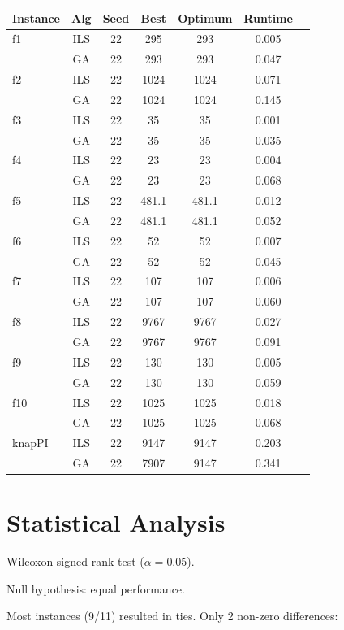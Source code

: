 \documentclass[12pt]{article}
\begin{document}
\begin{center}
\begin{tabular}{lcccccc}
\toprule
Instance & Alg & Seed & Best & Optimum & Runtime \\
\midrule
f1 & ILS & 22 & 295 & 293 & 0.005 \\
   & GA  & 22 & 293 & 293 & 0.047 \\
f2 & ILS & 22 & 1024 & 1024 & 0.071 \\
   & GA  & 22 & 1024 & 1024 & 0.145 \\
f3 & ILS & 22 & 35 & 35 & 0.001 \\
   & GA  & 22 & 35 & 35 & 0.035 \\
f4 & ILS & 22 & 23 & 23 & 0.004 \\
   & GA  & 22 & 23 & 23 & 0.068 \\
f5 & ILS & 22 & 481.1 & 481.1 & 0.012 \\
   & GA  & 22 & 481.1 & 481.1 & 0.052 \\
f6 & ILS & 22 & 52 & 52 & 0.007 \\
   & GA  & 22 & 52 & 52 & 0.045 \\
f7 & ILS & 22 & 107 & 107 & 0.006 \\
   & GA  & 22 & 107 & 107 & 0.060 \\
f8 & ILS & 22 & 9767 & 9767 & 0.027 \\
   & GA  & 22 & 9767 & 9767 & 0.091 \\
f9 & ILS & 22 & 130 & 130 & 0.005 \\
   & GA  & 22 & 130 & 130 & 0.059 \\
f10 & ILS & 22 & 1025 & 1025 & 0.018 \\
    & GA  & 22 & 1025 & 1025 & 0.068 \\
knapPI & ILS & 22 & 9147 & 9147 & 0.203 \\
       & GA  & 22 & 7907 & 9147 & 0.341 \\
\bottomrule
\end{tabular}
\end{center}

\section{Statistical Analysis}

Wilcoxon signed-rank test ($\alpha = 0.05$).

Null hypothesis: equal performance.

Most instances (9/11) resulted in ties. Only 2 non-zero differences:
\end{document}
